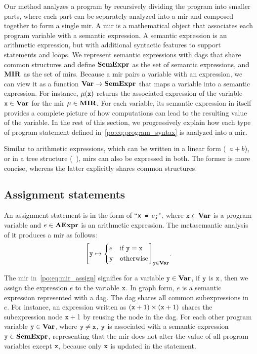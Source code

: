 Our method analyzes a program by recursively dividing the program into smaller
parts, where each part can be separately analyzed into a \gls{mir} and
composed together to form a single \gls{mir}\@.  A \gls{mir} is a mathematical
object that associates each program variable with a semantic expression.  A
semantic expression is an arithmetic expression, but with additional syntactic
features to support \iflit{} statements and \whilelit{} loops.  We represent
semantic expressions with \glspl{dag} that share common structures and define
$\mathbf{SemExpr}$ as the set of semantic expressions, and $\mathbf{MIR}$ as the set of
\glspl{mir}.  Because a \gls{mir} pairs a variable with an expression, we
can view it as a function $\mathbf{Var} \to \mathbf{SemExpr}$ that maps a variable into
a semantic expression.  For instance, $\mu(\texttt{x})$ returns the associated
expression of the variable $\texttt{x} \in \mathbf{Var}$ for the \gls{mir} $\mu \in
\mathbf{MIR}$.  For each variable, its semantic expression in itself provides a
complete picture of how computations can lead to the resulting value of the
variable.  In the rest of this section, we progressively explain how each type
of program statement defined in~\eqref{po:eq:program_syntax} is analyzed into a
\gls{mir}\@.

Similar to arithmetic expressions, which can be written in a linear form
(\eg~$a + b$), or in a tree structure (\eg~),
\glspl{mir} can also be expressed in both.  The former is more concise, whereas
the latter explicitly shares common structures.

\subsection{Assignment statements}

An assignment statement is in the form of ``\texttt{x = $e$;}'', where
$\texttt{x} \in \mathbf{Var}$ is a program variable and $e \in \mathbf{AExpr}$ is an
arithmetic expression.  The metasemantic analysis of it produces a \gls{mir}
as follows:
\begin{equation}
    {\left[
        \texttt{y}\mapsto \left\{
            \begin{aligned}
                & e && \text{if~} \texttt{y}= \texttt{x}\\
                & \texttt{y}&& \text{otherwise}
            \end{aligned}
        \right.
    \right]}_{\texttt{y} \in \mathbf{Var}}.
    \label{po:eq:mir_assign}
\end{equation}

The \gls{mir} in~\eqref{po:eq:mir_assign} signifies for a variable $\texttt{y} \in
\mathbf{Var}$, if $\texttt{y}$ is $\texttt{x}$, then we assign the expression $e$ to the
variable $\texttt{x}$.  In graph form, $e$ is a semantic expression represented with
a \gls{dag}\@.  The \gls{dag} shares all common subexpressions in $e$.  For
instance, an expression written as $(\texttt{x} + 1) \times (\texttt{x} + 1)$ shares the
subexpression node $\texttt{x} + 1$ by reusing the node in the \gls{dag}\@.  For
each other program variable $\texttt{y} \in \mathbf{Var}$, where $\texttt{y} \neq \texttt{x}$,
$\texttt{y}$ is associated with a semantic expression $\texttt{y} \in \mathbf{SemExpr}$,
representing that the \gls{mir} does not alter the value of all program
variables except $\texttt{x}$, because only $\texttt{x}$ is updated in the statement.

